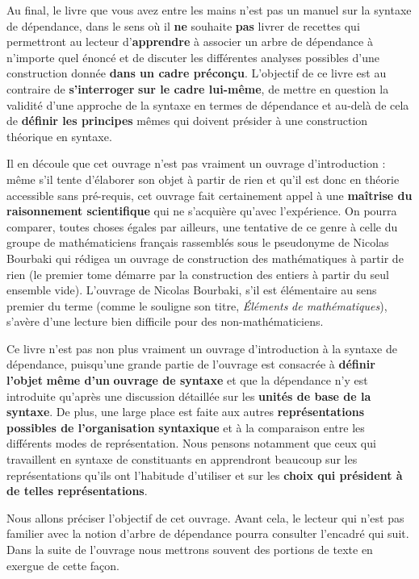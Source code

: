Au final, le livre que vous avez entre les mains n’est pas un manuel sur la syntaxe de dépendance, dans le sens où il \textbf{ne} souhaite \textbf{pas} livrer de recettes qui permettront au lecteur d’\textbf{apprendre} à associer un arbre de dépendance à n’importe quel énoncé et de discuter les différentes analyses possibles d’une construction donnée \textbf{dans un cadre préconçu}. L’objectif de ce livre est au contraire de \textbf{s’interroger} \textbf{sur le cadre lui-même}, de mettre en question la validité d’une approche de la syntaxe en termes de dépendance et au-delà de cela de \textbf{définir les principes} mêmes qui doivent présider à une construction théorique en syntaxe.

Il en découle que cet ouvrage n’est pas vraiment un ouvrage d’introduction : même s’il tente d’élaborer son objet à partir de rien et qu’il est donc en théorie accessible sans pré-requis, cet ouvrage fait certainement appel à une \textbf{maîtrise du raisonnement scientifique} qui ne s’acquière qu’avec l’expérience. On pourra comparer, toutes choses égales par ailleurs, une tentative de ce genre à celle du groupe de mathématiciens français rassemblés sous le pseudonyme de Nicolas Bourbaki qui rédigea un ouvrage de construction des mathématiques à partir de rien (le premier tome démarre par la construction des entiers à partir du seul ensemble vide). L’ouvrage de Nicolas Bourbaki, s’il est élémentaire au sens premier du terme (comme le souligne son titre, \textit{Éléments} \textit{de mathématiques}), s’avère d’une lecture bien difficile pour des non-mathématiciens.

Ce livre n’est pas non plus vraiment un ouvrage d’introduction à la syntaxe de dépendance, puisqu’une grande partie de l’ouvrage est consacrée à \textbf{définir l’objet} \textbf{même d’un} \textbf{ouvrage de syntaxe} et que la dépendance n’y est introduite qu’après une discussion détaillée sur les \textbf{unités de base de la syntaxe}. De plus, une large place est faite aux autres \textbf{représentations possibles de l’organisation} \textbf{syntaxique} et à la comparaison entre les différents modes de représentation. Nous pensons notamment que ceux qui travaillent en syntaxe de constituants en apprendront beaucoup sur les représentations qu’ils ont l’habitude d’utiliser et sur les \textbf{choix qui président à de telles représentations}.

Nous allons préciser l’objectif de cet ouvrage. Avant cela, le lecteur qui n’est pas familier avec la notion d’arbre de dépendance pourra consulter l’encadré qui suit. Dans la suite de l’ouvrage nous mettrons souvent des portions de texte en exergue de cette façon.

